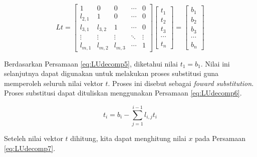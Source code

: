 \documentclass[
]{book}
\theoremstyle{definition}
\theoremstyle{definition}
\theoremstyle{definition}
\theoremstyle{definition}
\theoremstyle{remark}
\begin{document}
\begin{equation}
Lt=
\begin{bmatrix}
     1       & 0       & 0 &\cdots& 0           \\[0.3em]
     l_{2,1} & 1       & 0 &\cdots& 0           \\[0.3em]
     l_{3,1} & l_{3,2} & 1 &\cdots& 0           \\[0.3em]
     \vdots  & \vdots  & \vdots  &\ddots& \vdots            \\[0.3em]
     l_{m,1} & l_{m,2} & l_{m,3} &\cdots& 1
     \end{bmatrix}
\begin{bmatrix}
     t_1                                          \\[0.3em]
     t_2                                          \\[0.3em]
     t_3                                          \\[0.3em]
     \cdots                                       \\[0.3em]
     t_n                                       
     \end{bmatrix}
= \begin{bmatrix}
     b_1                                          \\[0.3em]
     b_2                                          \\[0.3em]
     b_3                                          \\[0.3em]
     \cdots                                       \\[0.3em]
     b_n                                       
     \end{bmatrix}
  \label{eq:LUdecomp5}
\end{equation}

Berdasarkan Persamaan \eqref{eq:LUdecomp5}, diketahui nilai \(t_1=b_1\). Nilai ini selanjutnya dapat digunakan untuk melakukan proses substitusi guna memperoleh seluruh nilai vektor \(t\). Proses ini disebut sebagai \emph{foward substitution}. Proses substitusi dapat dituliskan menggunakan Persamaan \eqref{eq:LUdecomp6}.

\begin{equation}
t_i=b_i-\sum_{j=1}^{i-1}l_{i,j}t_i
  \label{eq:LUdecomp6}
\end{equation}

Seteleh nilai vektor \(t\) dihitung, kita dapat menghitung nilai \(x\) pada Persamaan \eqref{eq:LUdecomp7}.
\end{document}
